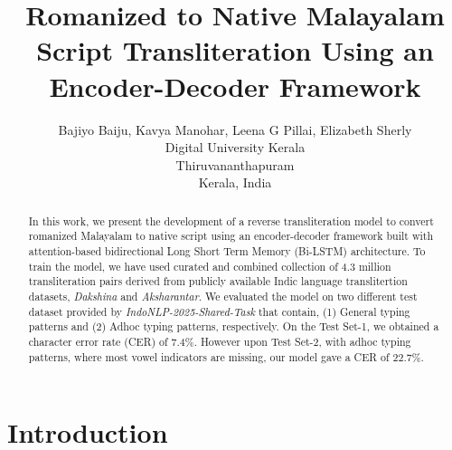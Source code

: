 \documentclass[11pt]{article}
\title{Romanized to Native Malayalam Script Transliteration Using an Encoder-Decoder Framework}
\author{Bajiyo Baiju, Kavya Manohar, Leena G Pillai, Elizabeth Sherly \\
       Digital University Kerala \\ Thiruvananthapuram \\ Kerala, India}
\begin{document}
\maketitle
\begin{abstract}
In this work, we present the development of a reverse transliteration model to convert romanized Malayalam to native script using an encoder-decoder framework built with attention-based bidirectional Long Short Term Memory (Bi-LSTM) architecture. To train the model, we have used curated and combined collection of 4.3 million transliteration pairs derived from publicly available Indic language translitertion datasets, \textit{Dakshina} and \textit{Aksharantar}. We evaluated the model on two different test dataset provided by \textit{ IndoNLP-2025-Shared-Task} that contain, (1) General typing patterns and (2) Adhoc typing patterns, respectively. On the Test Set-1, we obtained a character error rate (CER) of 7.4\%. However upon Test Set-2, with adhoc typing patterns, where most vowel indicators are missing, our model gave a CER of 22.7\%.


\end{abstract}

\section{Introduction}


\end{document}
